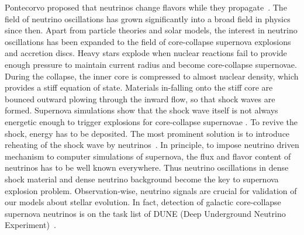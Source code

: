 Pontecorvo proposed that neutrinos change flavors while they propagate~\cite{Pontecorvo1968}. The field of neutrino oscillations has grown significantly into a broad field in physics since then. Apart from particle theories and solar models, the interest in neutrino oscillations has been expanded to the field of core-collapse supernova explosions and accretion discs. Heavy stars explode when nuclear reactions fail to provide enough pressure to maintain current radius and become core-collapse supernovae. During the collapse, the inner core is compressed to almost nuclear density, which provides a stiff equation of state. Materials in-falling onto the stiff core are bounced outward plowing through the inward flow, so that shock waves are formed. Supernova simulations show that the shock wave itself is not always energetic enough to trigger explosions for core-collapse supernovae \cite{Janka2016b}. To revive the shock, energy has to be deposited. The most prominent solution is to introduce reheating of the shock wave by neutrinos~\cite{Janka2016b}. In principle, to impose neutrino driven mechanism to computer simulations of supernova, the flux and flavor content of neutrinos has to be well known everywhere. Thus neutrino oscillations in dense shock material and dense neutrino background become the key to supernova explosion problem. Observation-wise, neutrino signals are crucial for validation of our models about stellar evolution. In fact, detection of galactic core-collapse supernova neutrinos is on the task list of DUNE (Deep Underground Neutrino Experiment)~\cite{Kemp2017}.

